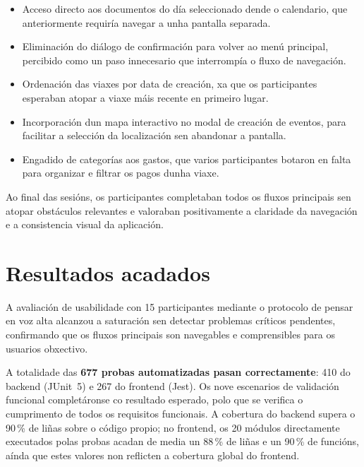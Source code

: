 \begin{itemize}
  \item Acceso directo aos documentos do día seleccionado dende o calendario, que
        anteriormente requiría navegar a unha pantalla separada.
  \item Eliminación do diálogo de confirmación para volver ao menú principal, percibido
        como un paso innecesario que interrompía o fluxo de navegación.
  \item Ordenación das viaxes por data de creación, xa que os participantes esperaban
        atopar a viaxe máis recente en primeiro lugar.
  \item Incorporación dun mapa interactivo no modal de creación de eventos, para facilitar
        a selección da localización sen abandonar a pantalla.
  \item Engadido de categorías aos gastos, que varios participantes botaron en falta para
        organizar e filtrar os pagos dunha viaxe.
\end{itemize}

Ao final das sesións, os participantes completaban todos os fluxos principais sen atopar
obstáculos relevantes e valoraban positivamente a claridade da navegación e a consistencia
visual da aplicación.

\section{Resultados acadados}

A avaliación de usabilidade con 15 participantes mediante o protocolo de pensar en voz
alta alcanzou a saturación sen detectar problemas críticos pendentes, confirmando que os
fluxos principais son navegables e comprensibles para os usuarios obxectivo.

A totalidade das \textbf{677 probas automatizadas pasan correctamente}: 410 do backend
(JUnit~5) e 267 do frontend (Jest). Os nove escenarios de validación funcional completáronse
co resultado esperado, polo que se verifica o cumprimento de todos os requisitos funcionais.
A cobertura do backend supera o 90\,\% de liñas sobre o código propio; no frontend, os
20 módulos directamente executados polas probas acadan de media un 88\,\% de liñas e un
90\,\% de funcións, aínda que estes valores non reflicten a cobertura global do frontend.
